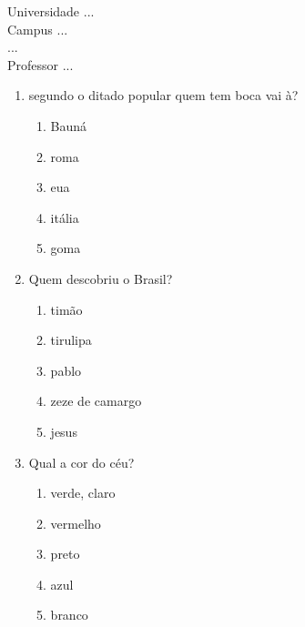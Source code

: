 \documentclass[10pt,a4paper,twocolumn]{report}
\begin{document}
\begin{flushleft}
Universidade ...\\
Campus ...\\
...\\
Professor ...\\
\end{flushleft}




 \begin{enumerate} 
    \item  segundo o ditado popular quem tem boca vai à?





    \begin{enumerate}
    \item  Bauná

\item  roma

\item  eua

\item  itália

\item  goma


    \end{enumerate} 
    \item  Quem descobriu o Brasil?





    \begin{enumerate}
    \item  timão

\item  tirulipa

\item  pablo

\item  zeze de camargo

\item  jesus


    \end{enumerate} 
    \item  Qual a cor do céu?





    \begin{enumerate}
    \item  verde, claro

\item  vermelho

\item  preto

\item  azul

\item  branco


    \end{enumerate}\end{enumerate} 
\end{document}
